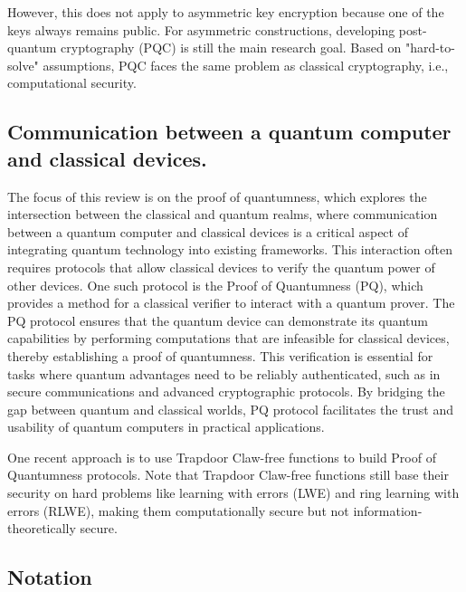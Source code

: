 \documentclass[cryptography,review,submit,pdftex,moreauthors,amsmath,amssymb,aps,strict]{Definitions/mdpi}
\begin{document}
However, this does not apply to asymmetric key encryption because one of the keys always remains public. For asymmetric constructions, developing post-quantum cryptography (PQC) is still the main research goal. Based on "hard-to-solve" assumptions, PQC faces the same problem as classical cryptography, i.e., computational security.

\subsection{Communication between a quantum computer and classical devices.}

The focus of this review is on the proof of quantumness, which explores the intersection between the classical and quantum realms, where communication between a quantum computer and classical devices is a critical aspect of integrating quantum technology into existing frameworks. This interaction often requires protocols that allow classical devices to verify the quantum power of other devices. One such protocol is the Proof of Quantumness (PQ), which provides a method for a classical verifier to interact with a quantum prover. The PQ protocol ensures that the quantum device can demonstrate its quantum capabilities by performing computations that are infeasible for classical devices, thereby establishing a proof of quantumness. This verification is essential for tasks where quantum advantages need to be reliably authenticated, such as in secure communications and advanced cryptographic protocols. By bridging the gap between quantum and classical worlds, PQ protocol facilitates the trust and usability of quantum computers in practical applications.

One recent approach is to use Trapdoor Claw-free functions to build Proof of Quantumness protocols. Note that Trapdoor Claw-free functions still base their security on hard problems like learning with errors (LWE) and ring learning with errors (RLWE), making them computationally secure but not information-theoretically secure.

\subsection{Notation}
\end{document}
